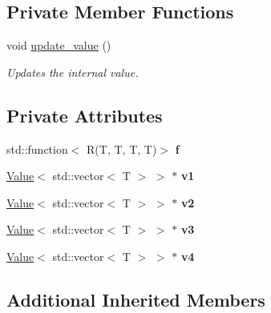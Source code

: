 \subsection*{Private Member Functions}
\begin{DoxyCompactItemize}
\item 
void \hyperlink{classfilval_1_1ZipMapFour_a0a228a51d603e70af7db4fb27ed1c186}{update\+\_\+value} ()
\begin{DoxyCompactList}\small\item\em Updates the internal value. \end{DoxyCompactList}\end{DoxyCompactItemize}
\subsection*{Private Attributes}
\begin{DoxyCompactItemize}
\item 
\hypertarget{classfilval_1_1ZipMapFour_a9979b1d3e038e8e296dbb98284fb10c6}{}\label{classfilval_1_1ZipMapFour_a9979b1d3e038e8e296dbb98284fb10c6} 
std\+::function$<$ R(T, T, T, T)$>$ {\bfseries f}
\item 
\hypertarget{classfilval_1_1ZipMapFour_a95aeaa25127a4ea95163a14040cef49c}{}\label{classfilval_1_1ZipMapFour_a95aeaa25127a4ea95163a14040cef49c} 
\hyperlink{classfilval_1_1Value}{Value}$<$ std\+::vector$<$ T $>$ $>$ $\ast$ {\bfseries v1}
\item 
\hypertarget{classfilval_1_1ZipMapFour_a12b6fc61264e6ed1292dc8ba8ab94070}{}\label{classfilval_1_1ZipMapFour_a12b6fc61264e6ed1292dc8ba8ab94070} 
\hyperlink{classfilval_1_1Value}{Value}$<$ std\+::vector$<$ T $>$ $>$ $\ast$ {\bfseries v2}
\item 
\hypertarget{classfilval_1_1ZipMapFour_a8c1ffaef3f4faa7b42266f01eeea0a32}{}\label{classfilval_1_1ZipMapFour_a8c1ffaef3f4faa7b42266f01eeea0a32} 
\hyperlink{classfilval_1_1Value}{Value}$<$ std\+::vector$<$ T $>$ $>$ $\ast$ {\bfseries v3}
\item 
\hypertarget{classfilval_1_1ZipMapFour_ab643512e9980d80339b09ae2e085d653}{}\label{classfilval_1_1ZipMapFour_ab643512e9980d80339b09ae2e085d653} 
\hyperlink{classfilval_1_1Value}{Value}$<$ std\+::vector$<$ T $>$ $>$ $\ast$ {\bfseries v4}
\end{DoxyCompactItemize}
\subsection*{Additional Inherited Members}


